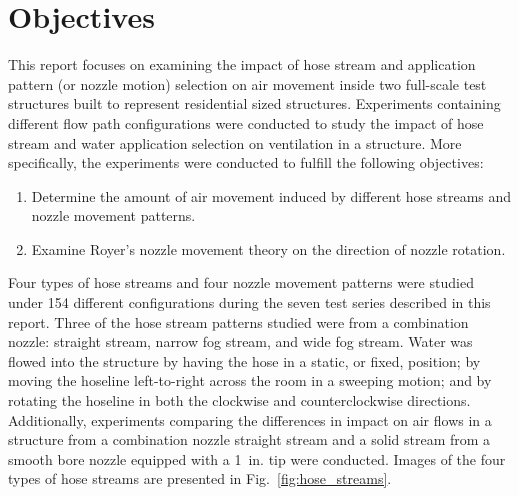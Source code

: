 \documentclass[12pt,oneside]{book}
\begin{document}
\section{Objectives}
\label{sec:objectives}
This report focuses on examining the impact of hose stream and application pattern (or nozzle motion) selection on air movement inside two full-scale test structures built to represent residential sized structures. Experiments containing different flow path configurations were conducted to study the impact of hose stream and water application selection on ventilation in a structure. More specifically, the experiments were conducted to fulfill the following objectives:

\begin{enumerate}
	\item Determine the amount of air movement induced by different hose streams and nozzle movement patterns.
	\item Examine Royer's nozzle movement theory on the direction of nozzle rotation.
\end{enumerate}

Four types of hose streams and four nozzle movement patterns were studied under 154 different configurations during the seven test series described in this report. Three of the hose stream patterns studied were from a combination nozzle: straight stream, narrow fog stream, and wide fog stream. Water was flowed into the structure by having the hose in a static, or fixed, position; by moving the hoseline left-to-right across the room in a sweeping motion; and by rotating the hoseline in both the clockwise and counterclockwise directions. Additionally, experiments comparing the differences in impact on air flows in a structure from a combination nozzle straight stream and a solid stream from a smooth bore nozzle equipped with a 1~in. tip were conducted. Images of the four types of hose streams are presented in Fig.~\ref{fig:hose_streams}.
\end{document}
